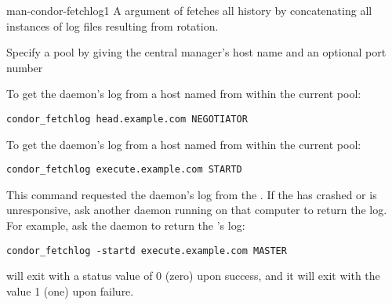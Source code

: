 \begin{ManPage}{}{man-condor-fetchlog}{1}
A  argument of  fetches all 
 history by concatenating all instances of log files
resulting from rotation.

\begin{Options}
    \ToolArgsBaseDesc
    {Specify a pool by giving the central manager's host name
    and an optional port number}
\end{Options}

\Examples
To get the  daemon's log from a host named 
 from within the current pool:
\begin{verbatim}
condor_fetchlog head.example.com NEGOTIATOR
\end{verbatim}

To get the  daemon's log from a host named
 from within the current pool:
\begin{verbatim}
condor_fetchlog execute.example.com STARTD
\end{verbatim}

This command requested the  daemon's log from the
.
If the  has crashed or is unresponsive,
ask another daemon
running on that computer to return the log.
For example, ask the  daemon to return the
's log:

\begin{verbatim}
condor_fetchlog -startd execute.example.com MASTER
\end{verbatim}

\ExitStatus
{} will exit with a status value of 0 (zero) upon success,
and it will exit with the value 1 (one) upon failure.

\end{ManPage}
